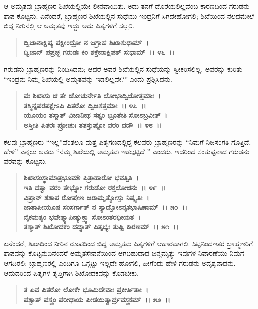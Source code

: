 ಆ ಅಮೃತವು ಬ್ರಾಹ್ಮಣರ ಶಿಖೆಯಲ್ಲಿಯೇ ಲೀನವಾಯಿತು. ಅದು ತನಗೆ ದೊರೆಯಲಿಲ್ಲವೆಂಬ ಕಾರಣದಿಂದ ಗರುಡನು ಶಾಪ ಕೊಟ್ಟನು. ಏನೆಂದರೆ, ಬ್ರಾಹ್ಮಣರ ಶಿಖೆಯಲ್ಲಿನ ಸುಧೆಯು ಇಂದ್ರನಿಗೆ ಸಿಗದೇಹೋಗಲಿ; ಶಿಖೆಯಿಂದ ನೆಲದಮೇಲೆ ಬಿದ್ದ ನೀರಿನಲ್ಲಿ ಆ ಅಮೃತವು ಇದ್ದು ಅದು ಪಿತೃಗಳಿಗೆ ಸಲ್ಲಲಿ.

\begin{verse}
\textbf{ದ್ವಿಜಾನಾಕ್ಷಿಪ್ಯ ಪಕ್ಷೀಂದ್ರೋ ನ ಜಗ್ರಾಹ ಶಿಖಾಸುಧಾಮ್~।}\\\textbf{ದ್ವಿಜಾನ್ ಪಪ್ರಚ್ಛ ಗರುಡಃ ಕಿಂ ಶಕ್ತೇನಾಕ್ಷಿಪತ್ ಸುಧಾಮ್~।। ೪೬~।।}
\end{verse}

ಗರುಡನು ಬ್ರಾಹ್ಮಣರನ್ನು ನಿಂದಿಸಿದನು; ಆದರೆ ಅವರ ಶಿಖೆಯಲ್ಲಿನ ಸುಧೆಯನ್ನು ಸ್ವೀಕರಿಸಲಿಲ್ಲ. ಅವರನ್ನು ಕುರಿತು “ಇಂದ್ರನು ನಿಮ್ಮ ಶಿಖೆಯಲ್ಲಿ ಅಮೃತವನ್ನು ಇಡಲಿಲ್ಲವೇ?” ಎಂದು ಪ್ರಶ್ನಿಸಿದನು.

\begin{verse}
\textbf{ವಃ ಶಿಖಾಸು ಚ ತೇ ಚೋಚುರ್ನೇತಿ ಲೋಭಾದ್ವಿಜೋತ್ತಮಾಃ~।}\\\textbf{ತಸ್ಮಿನ್ನಪರಪಕ್ಷೇಽಪಿ ಪಿತರೋ ದ್ವಿಜಸತ್ತಮಾಃ~।। ೪೭~।।}\\\textbf{ಯೂಯಂ ತಸ್ಮಾತ್ ವಿಜಾನೀಥ ಸತ್ಯಂ ಬ್ರೂತೇತಿ ಸೋಽಬ್ರವೀತ್~।}\\\textbf{ಅಸ್ತೀತಿ ಪಿತರಃ ಪ್ರೋಚುಃ ತತಸ್ತುಷ್ಟೋ ವರಂ ದದೌ~।। ೪೮~।।}
\end{verse}

ಕೆಲವು ಬ್ರಾಹ್ಮಣರು “ಇಲ್ಲ”ವೆಂತಲೂ ಮತ್ತೆ ಪಿತೃಗಣದಲ್ಲಿದ್ದ ಕೆಲವರು ಬ್ರಾಹ್ಮಣರನ್ನು “ನಿಮಗೆ ನಿಜಸಂಗತಿ ಗೊತ್ತಿದೆ, ಹೇಳಿ” ಎನ್ನಲು ಅವರು “ನಮ್ಮ ಶಿಖೆಯಲ್ಲಿ ಅಮೃತವು ಇಡಲ್ಪಟ್ಟಿದೆ ” ಎಂದರು. ಇದರಿಂದ ಸಂತುಷ್ಟನಾದ ಗರುಡನು ವರವನ್ನು ಕೊಟ್ಟನು.

\begin{verse}
\textbf{ಶಿಖಾಸಂಸ್ಥಾಮಾತ್ರಭೂಮೌ ಪಿತ್ರಾಹಾರೋ ಭವತ್ವಿತಿ~।}\\\textbf{ಇತಿ ದತ್ವಾ ವರಂ ತೇಭ್ಯೋ ಗರುಡೋ ರಕ್ತಲೋಚನಃ~।। ೪೯~।।}\\\textbf{ವಿಪ್ರಾನ್ ಶಶಾಪ ರೋಷೇಣ ಜರಾಮೃತ್ಯೋಸ್ತು ನಿಷ್ಕೃತಿಃ~।}\\\textbf{ಜಾತಾಪೀಯೂಷ ಸಂಸರ್ಗಾತ್ ನ ಸ್ಯಾದ್ವೋಽನೃತಭಾಷಿಣಾಮ್~।। ೫೦~।।}\\\textbf{ನೈಕಮತ್ಯಂ ಭವೇತ್ಕ್ವಾಪೀತ್ಯುಕ್ತ್ವಾ ಸೋಽಂತರಧೀಯತ~।}\\\textbf{ತಸ್ಮಾತ್ ಶಿಖೋದಕಂ ದದ್ಯಾತ್ ಪಿತೃಭ್ಯಃ ತುಷ್ಟಿ ಕಾರಣಮ್~।। ೫೧~।।}
\end{verse}

ಏನೆಂದರೆ, ಶಿಖಾದಿಂದ ನೀರಿನ ರೂಪದಿಂದ ಬಿದ್ದ ಅಮೃತಮ ಪಿತೃಗಳಿಗೆ ಆಹಾರವಾಗಲಿ. ಸಿಟ್ಟಿನಿಂದಇತರ ಬ್ರಾಹ್ಮಣರಿಗೆ ಶಾಪವನ್ನು ಕೊಟ್ಟನುಏನೆಂದರೆ ಅಮೃತಸೇವನೆಯಿಂದ ಆಗಬಹುದಾದ ಜನ್ಮಮೃತ್ಯು ಇವುಗಳ ನಿವಾರಣೆಯು ನಿಮಗೆ ಆಗದಿರಲಿ; ಬ್ರಾಹ್ಮಣರಲ್ಲಿ ಎಂದಿಗೂ ಒಗ್ಗಟ್ಟು ಇಲ್ಲದೇ ಹೋಗಲಿ, ಹೀಗೆಂದು ಹೇಳಿ ಗರುಡನು ಅದೃಶ್ಯನಾದನು. ಆದುದರಿಂದ ಪಿತೃಗಳ ತೃಪ್ತಿಗಾಗಿ ಶಿಖೋದಕವನ್ನು ಕೊಡಬೇಕು.

\begin{verse}
\textbf{ತ ಏವ ಪಿತರೋ ಲೋಕೇ ಭೂಮಿದೇವಾಃ ಪ್ರಕೀರ್ತಿತಾಃ~।}\\\textbf{ಪಶ್ಚಾತ್ ವಸ್ತ್ರಂ ಪರೀಧಾಯ ಪೀಡಯಿತ್ವಾರ್ದ್ರವಸ್ತ್ರಕಮ್~।। ೫೨~।।}
\end{verse}

